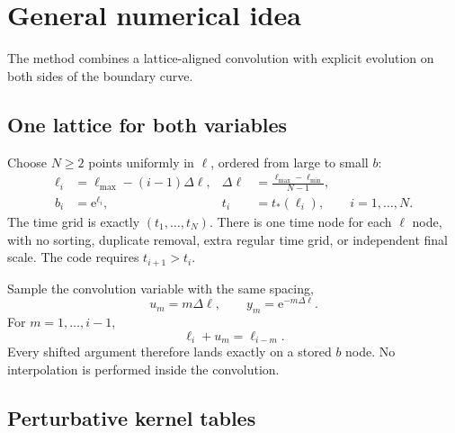 \documentclass[11pt]{article}
\newcommand{\ee}{\mathrm{e}}
\begin{document}
\section{General numerical idea}

The method combines a lattice-aligned convolution with explicit evolution on
both sides of the boundary curve.

\subsection{One lattice for both variables}

Choose \(N\ge2\) points uniformly in \(\ell\), ordered from large to small
\(b\):
\begin{align}
  \ell_i
  &=
  \ell_{\max}-(i-1)\Delta\ell,
  &
  \Delta\ell
  &=
  \frac{\ell_{\max}-\ell_{\min}}{N-1},
  \label{eq:ell-grid}\\
  b_i&=\ee^{\ell_i},
  &
  t_i&=t_*(\ell_i),
  \qquad i=1,\ldots,N.
  \label{eq:paired-grid}
\end{align}
The time grid is exactly \((t_1,\ldots,t_N)\). There is one time node for each
\(\ell\) node, with no sorting, duplicate removal, extra regular time grid, or
independent final scale. The code requires \(t_{i+1}>t_i\).

Sample the convolution variable with the same spacing,
\begin{equation}
  u_m=m\Delta\ell,
  \qquad
  y_m=\ee^{-m\Delta\ell}.
  \label{eq:u-grid}
\end{equation}
For \(m=1,\ldots,i-1\),
\begin{equation}
  \ell_i+u_m=\ell_{i-m}.
  \label{eq:lattice-alignment}
\end{equation}
Every shifted argument therefore lands exactly on a stored \(b\) node. No
interpolation is performed inside the convolution.

\subsection{Perturbative kernel tables}
\end{document}
